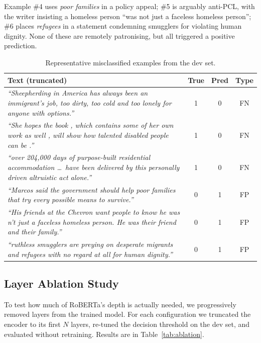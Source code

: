 \documentclass[11pt,a4paper]{article}
\begin{document}
Example \#4 uses \textit{poor families} in a policy appeal; \#5 is arguably anti-PCL, with the writer insisting a homeless person ``was not just a faceless homeless person''; \#6 places \textit{refugees} in a statement condemning smugglers for violating human dignity. None of these are remotely patronising, but all triggered a positive prediction.

\begin{table}
    \centering
    \caption{Representative misclassified examples from the dev set.}
    \label{tab:errors}
    \begin{tabularx}{\textwidth}{X c c c}
        \toprule
        \textbf{Text (truncated)} & \textbf{True} & \textbf{Pred} & \textbf{Type} \\
        \midrule
        \textit{``Sheepherding in America has always been an immigrant's job, too dirty, too cold and too lonely for anyone with options.''} & 1 & 0 & FN \\[4pt]
        \textit{``She hopes the book , which contains some of her own work as well , will show how talented disabled people can be .''} & 1 & 0 & FN \\[4pt]
        \textit{``over 204,000 days of purpose-built residential accommodation \ldots\ have been delivered by this personally driven altruistic act alone.''} & 1 & 0 & FN \\[4pt]
        \midrule
        \textit{``Marcos said the government should help poor families that try every possible means to survive.''} & 0 & 1 & FP \\[4pt]
        \textit{``His friends at the Chevron want people to know he was n't just a faceless homeless person. He was their friend and their family.''} & 0 & 1 & FP \\[4pt]
        \textit{``ruthless smugglers are preying on desperate migrants and refugees with no regard at all for human dignity.''} & 0 & 1 & FP \\
        \bottomrule
    \end{tabularx}
\end{table}

\subsection{Layer Ablation Study}

To test how much of RoBERTa's depth is actually needed, we progressively removed layers from the trained model. For each configuration we truncated the encoder to its first $N$ layers, re-tuned the decision threshold on the dev set, and evaluated without retraining. Results are in Table~\ref{tab:ablation}.
\end{document}
